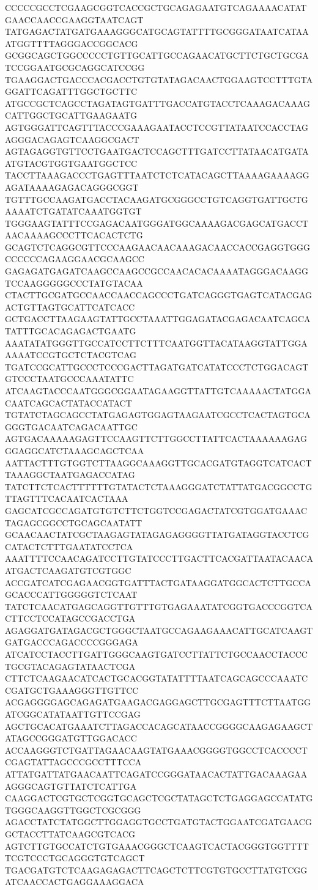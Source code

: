 CCCCCGCCTCGAAGCGGTCACCGCTGCAGAGAATGTCAGAAAACATATGAACCAACCGAAGGTAATCAGT
TATGAGACTATGATGAAAGGGCATGCAGTATTTTGCGGGATAATCATAAATGGTTTTAGGGACCGGCACG
GCGGCAGCTGGCCCCCTGTTGCATTGCCAGAACATGCTTCTGCTGCGATCCGGAATGCGCAGGCATCCGG
TGAAGGACTGACCCACGACCTGTGTATAGACAACTGGAAGTCCTTTGTAGGATTCAGATTTGGCTGCTTC
ATGCCGCTCAGCCTAGATAGTGATTTGACCATGTACCTCAAAGACAAAGCATTGGCTGCATTGAAGAATG
AGTGGGATTCAGTTTACCCGAAAGAATACCTCCGTTATAATCCACCTAGAGGGACAGAGTCAAGGCGACT
AGTAGAGGTGTTCCTGAATGACTCCAGCTTTGATCCTTATAACATGATAATGTACGTGGTGAATGGCTCC
TACCTTAAAGACCCTGAGTTTAATCTCTCATACAGCTTAAAAGAAAAGGAGATAAAAGAGACAGGGCGGT
TGTTTGCCAAGATGACCTACAAGATGCGGGCCTGTCAGGTGATTGCTGAAAATCTGATATCAAATGGTGT
TGGGAAGTATTTCCGAGACAATGGGATGGCAAAAGACGAGCATGACCTAACAAAAGCCCTTCACACTCTG
GCAGTCTCAGGCGTTCCCAAGAACAACAAAGACAACCACCGAGGTGGGCCCCCCAGAAGGAACGCAAGCC
GAGAGATGAGATCAAGCCAAGCCGCCAACACACAAAATAGGGACAAGGTCCAAGGGGGCCCTATGTACAA
CTACTTGCGATGCCAACCAACCAGCCCTGATCAGGGTGAGTCATACGAGACTGTTAGTGCATTCATCACC
GCTGACCTTAAGAAGTATTGCCTAAATTGGAGATACGAGACAATCAGCATATTTGCACAGAGACTGAATG
AAATATATGGGTTGCCATCCTTCTTTCAATGGTTACATAAGGTATTGGAAAAATCCGTGCTCTACGTCAG
TGATCCGCATTGCCCTCCCGACTTAGATGATCATATCCCTCTGGACAGTGTCCCTAATGCCCAAATATTC
ATCAAGTACCCAATGGGCGGAATAGAAGGTTATTGTCAAAAACTATGGACAATCAGCACTATACCATACT
TGTATCTAGCAGCCTATGAGAGTGGAGTAAGAATCGCCTCACTAGTGCAGGGTGACAATCAGACAATTGC
AGTGACAAAAAGAGTTCCAAGTTCTTGGCCTTATTCACTAAAAAAGAGGGAGGCATCTAAAGCAGCTCAA
AATTACTTTGTGGTCTTAAGGCAAAGGTTGCACGATGTAGGTCATCACTTAAAGGCTAATGAGACCATAG
TATCTTCTCACTTTTTTGTATACTCTAAAGGGATCTATTATGACGGCCTGTTAGTTTCACAATCACTAAA
GAGCATCGCCAGATGTGTCTTCTGGTCCGAGACTATCGTGGATGAAACTAGAGCGGCCTGCAGCAATATT
GCAACAACTATCGCTAAGAGTATAGAGAGGGGTTATGATAGGTACCTCGCATACTCTTTGAATATCCTCA
AAATTTTCCAACAGATCCTTGTATCCCTTGACTTCACGATTAATACAACAATGACTCAAGATGTCGTGGC
ACCGATCATCGAGAACGGTGATTTACTGATAAGGATGGCACTCTTGCCAGCACCCATTGGGGGTCTCAAT
TATCTCAACATGAGCAGGTTGTTTGTGAGAAATATCGGTGACCCGGTCACTTCCTCCATAGCCGACCTGA
AGAGGATGATAGACGCTGGGCTAATGCCAGAAGAAACATTGCATCAAGTGATGACCCAGACCCCGGGAGA
ATCATCCTACCTTGATTGGGCAAGTGATCCTTATTCTGCCAACCTACCCTGCGTACAGAGTATAACTCGA
CTTCTCAAGAACATCACTGCACGGTATATTTTAATCAGCAGCCCAAATCCGATGCTGAAAGGGTTGTTCC
ACGAGGGGAGCAGAGATGAAGACGAGGAGCTTGCGAGTTTCTTAATGGATCGGCATATAATTGTTCCGAG
AGCTGCACATGAAATCTTAGACCACAGCATAACCGGGGCAAGAGAAGCTATAGCCGGGATGTTGGACACC
ACCAAGGGTCTGATTAGAACAAGTATGAAACGGGGTGGCCTCACCCCTCGAGTATTAGCCCGCCTTTCCA
ATTATGATTATGAACAATTCAGATCCGGGATAACACTATTGACAAAGAAAGGGCAGTGTTATCTCATTGA
CAAGGACTCGTGCTCGGTGCAGCTCGCTATAGCTCTGAGGAGCCATATGTGGGCAAGGTTGGCTCGCGGG
AGACCTATCTATGGCTTGGAGGTGCCTGATGTACTGGAATCGATGAACGGCTACCTTATCAAGCGTCACG
AGTCTTGTGCCATCTGTGAAACGGGCTCAAGTCACTACGGGTGGTTTTTCGTCCCTGCAGGGTGTCAGCT
TGACGATGTCTCAAGAGAGACTTCAGCTCTTCGTGTGCCTTATGTCGGATCAACCACTGAGGAAAGGACA

